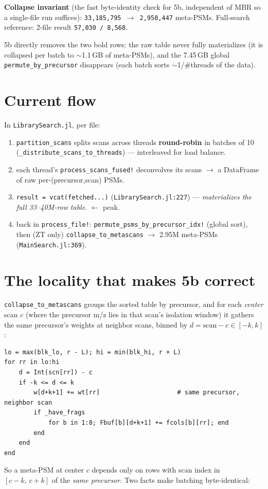 \documentclass[11pt]{article}
\newcommand{\code}[1]{\texttt{\small #1}}
\begin{document}
\noindent\textbf{Collapse invariant} (the fast byte-identity check for 5b, independent
of MBR so a single-file run suffices): \code{33{,}185{,}795 $\rightarrow$ 2{,}950{,}447}
meta-PSMs. Full-search reference: 2-file result \code{57{,}030 / 8{,}568}.

\medskip\noindent
5b directly removes the two bold rows: the raw table never fully materializes (it is
collapsed per batch to $\sim$1.1\,GB of meta-PSMs), and the 7.45\,GB global
\code{permute\_by\_precursor} disappears (each batch sorts $\sim$1/\#threads of the data).

\section{Current flow}
In \code{LibrarySearch.jl}, per file:
\begin{enumerate}[nosep]
  \item \code{partition\_scans} splits scans across threads \textbf{round-robin} in
    batches of 10 (\code{\_distribute\_scans\_to\_threads}) --- interleaved for load balance.
  \item each thread's \code{process\_scans\_fused!} deconvolves its scans $\rightarrow$
    a DataFrame of raw per-(precursor,scan) PSMs.
  \item \code{result = vcat(fetched...)} (\code{LibrarySearch.jl:227}) --- \emph{materializes
    the full 33--40M-row table}. $\leftarrow$ peak.
  \item back in \code{process\_file!}: \code{permute\_psms\_by\_precursor\_idx!} (global sort),
    then (ZT only) \code{collapse\_to\_metascans} $\rightarrow$ 2.95M meta-PSMs
    (\code{MainSearch.jl:369}).
\end{enumerate}

\section{The locality that makes 5b correct}
\code{collapse\_to\_metascans} groups the sorted table by precursor, and for each
\emph{center} scan $c$ (where the precursor m/z lies in that scan's isolation window) it
gathers the same precursor's weights at neighbor scans, binned by
$d = \text{scan}-c \in [-k, k]$:
\begin{lstlisting}
lo = max(blk_lo, r - L); hi = min(blk_hi, r + L)
for rr in lo:hi
    d = Int(scn[rr]) - c
    if -k <= d <= k
        w[d+k+1] += wt[rr]                     # same precursor, neighbor scan
        if _have_frags
            for b in 1:8; Fbuf[b][d+k+1] += fcols[b][rr]; end
        end
    end
end
\end{lstlisting}
So a meta-PSM at center $c$ depends only on rows with scan index in $[c-k,\,c+k]$ of the
\emph{same precursor}. Two facts make batching byte-identical:
\end{document}
